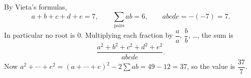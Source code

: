 By Vieta's formulas,
\[a+b+c+d+e=7,\qquad\sum_{\text{pairs}}ab=6,\qquad abcde=-(-7)=7.\]
In particular no root is $0$. Multiplying each fraction by $\dfrac{a}{a}$, $\dfrac bb$, \dots, the sum is
\[\dfrac{a^2+b^2+c^2+d^2+e^2}{abcde}.\]
Now $a^2+\cdots+e^2=(a+\cdots+e)^2-2\sum ab=49-12=37$, so the value is $\boxed{\dfrac{37}{7}}$.
